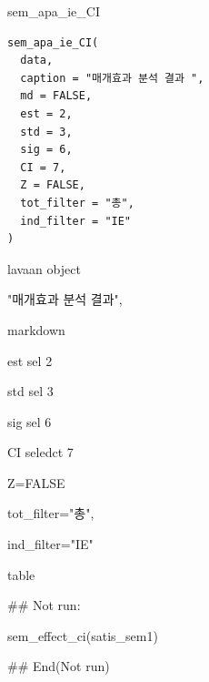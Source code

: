\documentclass[a4paper]{book}
\begin{document}
%
\begin{Description}
sem\_apa\_ie\_CI
\end{Description}
%
\begin{Usage}
\begin{verbatim}
sem_apa_ie_CI(
  data,
  caption = "매개효과 분석 결과 ",
  md = FALSE,
  est = 2,
  std = 3,
  sig = 6,
  CI = 7,
  Z = FALSE,
  tot_filter = "총",
  ind_filter = "IE"
)
\end{verbatim}
\end{Usage}
%
\begin{Arguments}
\begin{ldescription}
\item[\code{data}] lavaan object

\item[\code{caption}] "매개효과 분석 결과",

\item[\code{md}] markdown

\item[\code{est}] est sel 2

\item[\code{std}] std sel 3

\item[\code{sig}] sig sel 6

\item[\code{CI}] CI seledct 7

\item[\code{Z}] Z=FALSE

\item[\code{tot\_filter}] tot\_filter="총",

\item[\code{ind\_filter}] ind\_filter="IE"
\end{ldescription}
\end{Arguments}
%
\begin{Value}
table
\end{Value}
%
\begin{Examples}
\begin{ExampleCode}

\#\# Not run: 

sem_effect_ci(satis_sem1)%


## End(Not run)
\end{ExampleCode}
\end{Examples}
\end{document}
